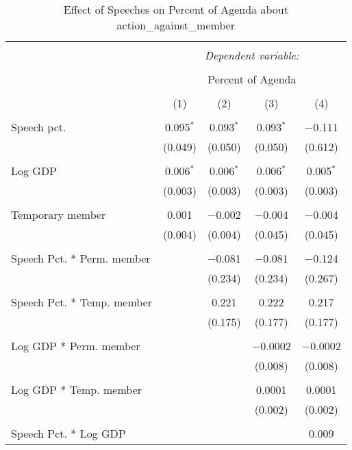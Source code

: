 
\begin{table}[!htbp] \centering 
  \caption{Effect of Speeches on Percent of Agenda about  action_against_member} 
  \label{} 
\begin{tabular}{@{\extracolsep{5pt}}lcccc} 
\\[-1.8ex]\hline 
\hline \\[-1.8ex] 
 & \multicolumn{4}{c}{\textit{Dependent variable:}} \\ 
\cline{2-5} 
\\[-1.8ex] & \multicolumn{4}{c}{Percent of Agenda} \\ 
\\[-1.8ex] & (1) & (2) & (3) & (4)\\ 
\hline \\[-1.8ex] 
 Speech pct. & 0.095$^{*}$ & 0.093$^{*}$ & 0.093$^{*}$ & $-$0.111 \\ 
  & (0.049) & (0.050) & (0.050) & (0.612) \\ 
  & & & & \\ 
 Log GDP & 0.006$^{*}$ & 0.006$^{*}$ & 0.006$^{*}$ & 0.005$^{*}$ \\ 
  & (0.003) & (0.003) & (0.003) & (0.003) \\ 
  & & & & \\ 
 Temporary member & 0.001 & $-$0.002 & $-$0.004 & $-$0.004 \\ 
  & (0.004) & (0.004) & (0.045) & (0.045) \\ 
  & & & & \\ 
 Speech Pct. * Perm. member &  & $-$0.081 & $-$0.081 & $-$0.124 \\ 
  &  & (0.234) & (0.234) & (0.267) \\ 
  & & & & \\ 
 Speech Pct. * Temp. member &  & 0.221 & 0.222 & 0.217 \\ 
  &  & (0.175) & (0.177) & (0.177) \\ 
  & & & & \\ 
 Log GDP * Perm. member &  &  & $-$0.0002 & $-$0.0002 \\ 
  &  &  & (0.008) & (0.008) \\ 
  & & & & \\ 
 Log GDP * Temp. member &  &  & 0.0001 & 0.0001 \\ 
  &  &  & (0.002) & (0.002) \\ 
  & & & & \\ 
 Speech Pct. * Log GDP &  &  &  & 0.009 \\ 

\end{tabular}
\end{table}
